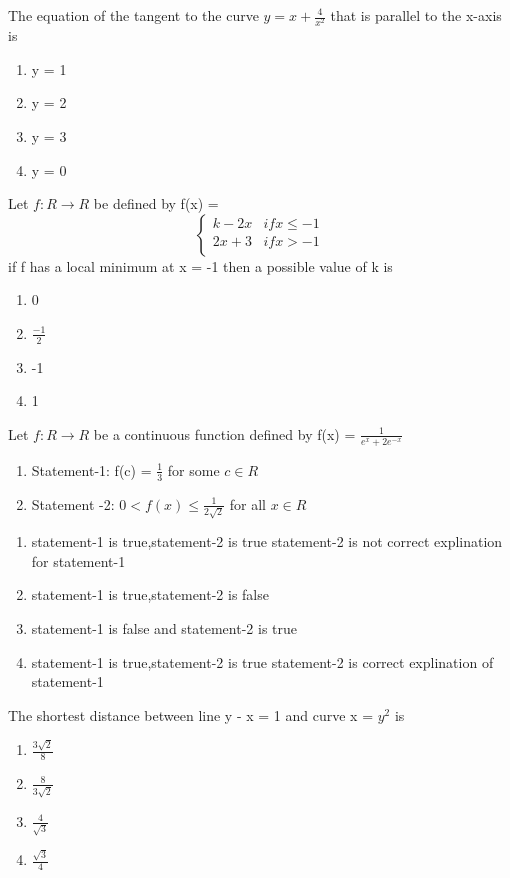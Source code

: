 \item The equation of the tangent to the curve $y = x + \frac{4}{x^2}$ that is parallel to the x-axis is 
\begin{enumerate}
\item y = 1
\item y = 2
\item y = 3
\item y = 0
\end{enumerate}

\item Let $f: R \to R$ be defined by f(x) = 
\[ \begin{cases} 
      k - 2x &  if x \leq -1 \\
      2x + 3 & if x > -1\\
      \end{cases}
\] 
if f has a local minimum at x = -1 then a possible value of k is 
\begin{enumerate}
\item 0
\item $\frac{-1}{2}$
\item -1
\item 1
\end{enumerate}

\item Let $f: R \to R$ be a continuous function defined by f(x) = $\frac{1}{e^x + 2e^{-x}}$
\begin{enumerate}
\item Statement-1: f(c) = $\frac{1}{3}$ for some $c \in R$
\item Statement -2: $0 < f(x) \leq \frac{1}{2\sqrt{2}}$ for all $x \in R$
\end{enumerate}
\begin{enumerate}
\item statement-1 is true,statement-2 is true statement-2 is not correct explination for statement-1
\item statement-1 is true,statement-2 is false 
\item statement-1 is false and statement-2 is true 
\item statement-1 is true,statement-2 is true statement-2 is correct explination of statement-1
\end{enumerate}

\item The shortest distance between line y - x = 1 and curve x = $y^2$ is 
\begin{enumerate}
\item $\frac{3\sqrt{2}}{8}$
\item $\frac{8}{3\sqrt{2}}$
\item $\frac{4}{\sqrt{3}}$
\item $\frac{\sqrt{3}}{4}$
\end{enumerate}

